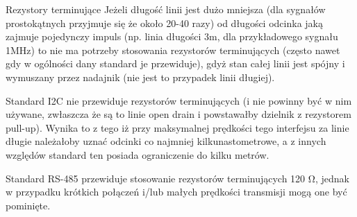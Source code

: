 \begin{ProTip}[breakable]{Rezystory terminujące }
Jeżeli długość linii jest dużo mniejsza (dla sygnałów prostokątnych przyjmuje się że około 20-40 razy) od długości odcinka jaką zajmuje pojedynczy impuls (np. linia długości 3m, dla przykładowego sygnału 1MHz)
to nie ma potrzeby stosowania rezystorów terminujących (często nawet gdy w ogólności dany standard je przewiduje), gdyż stan całej linii jest spójny i wymuszany przez nadajnik (nie jest to przypadek linii długiej).

\vspace{7pt}

Standard I2C nie przewiduje rezystorów terminujących (i nie powinny być w nim używane, zwłaszcza że są to linie open drain i powstawałby dzielnik z rezystorem pull-up).
Wynika to z tego iż przy maksymalnej prędkości tego interfejsu za linie długie należałoby uznać odcinki co najmniej kilkunastometrowe, a z innych względów standard ten posiada ograniczenie do kilku metrów.

Standard RS-485 przewiduje stosowanie rezystorów terminujących 120 Ω, jednak w przypadku krótkich połączeń i/lub małych prędkości transmisji mogą one być pominięte.
\end{ProTip}
